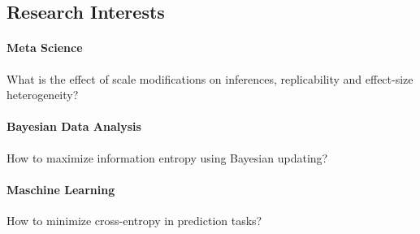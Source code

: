 \documentclass[10pt]{FreemanCV}
\begin{document}
\begin{paracol}{2}
\section{Research Interests}

\paragraph{Meta Science}
What is the effect of scale modifications on inferences, replicability and
effect-size heterogeneity? 

\vspace{-6pt}

\paragraph{Bayesian Data Analysis}
How to maximize information entropy using Bayesian updating?

\vspace{-6pt}

\paragraph{Maschine Learning}
How to minimize cross-entropy in prediction tasks?







\end{paracol}
\end{document}
